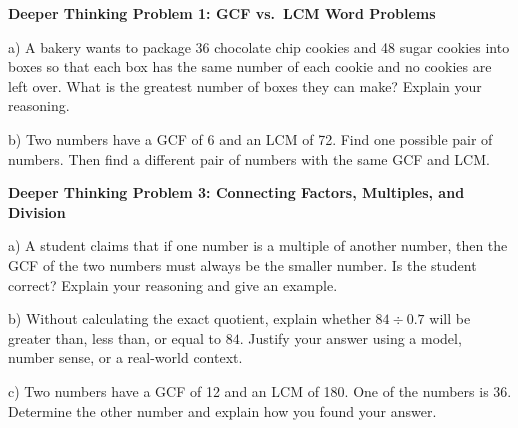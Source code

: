 \documentclass[12pt, letterpaper, fleqn]{article}
\begin{document}
\begin{tcolorbox}[colback=white, colframe=black, boxrule=1pt, arc=4mm, left=6mm, right=6mm, top=5mm, bottom=5mm]
\textbf{Deeper Thinking Problem 1: GCF vs.\ LCM Word Problems}

\medskip

\noindent
a) A bakery wants to package 36 chocolate chip cookies and 48 sugar cookies into boxes so that each box has the same number of each cookie and no cookies are left over. What is the greatest number of boxes they can make? Explain your reasoning.

\vspace{3cm}
\noindent
b) Two numbers have a GCF of 6 and an LCM of 72. Find one possible pair of numbers. Then find a different pair of numbers with the same GCF and LCM.

\vspace{3cm}

\end{tcolorbox}
\newpage

\begin{tcolorbox}[colback=white, colframe=black, boxrule=1pt, arc=4mm, left=6mm, right=6mm, top=5mm, bottom=5mm]
\textbf{Deeper Thinking Problem 3: Connecting Factors, Multiples, and Division}

\medskip

\noindent
a) A student claims that if one number is a multiple of another number, then the GCF of the two numbers must always be the smaller number. Is the student correct? Explain your reasoning and give an example.

\vspace{5cm}

\noindent
b) Without calculating the exact quotient, explain whether $84 \div 0.7$ will be greater than, less than, or equal to $84$. Justify your answer using a model, number sense, or a real-world context.

\vspace{5cm}
\noindent
c) Two numbers have a GCF of 12 and an LCM of 180. One of the numbers is 36. Determine the other number and explain how you found your answer.


\vspace{5cm}
\end{tcolorbox}
\newpage
\end{document}

